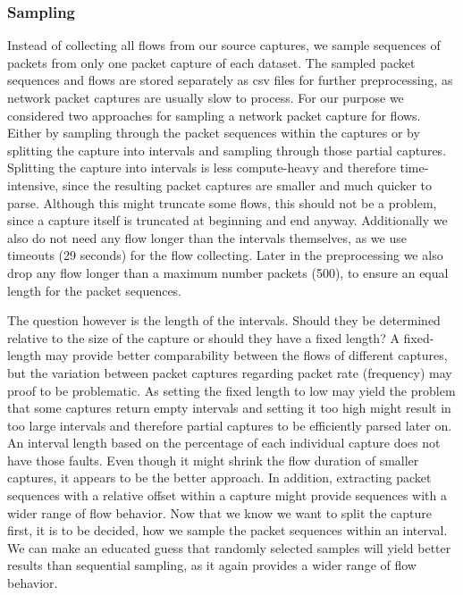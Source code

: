 \documentclass[
	ngerman,
	ruledheaders=section,%
	class=report,%
	thesis={type=bachelor},%
	accentcolor=9c,%
	custommargins=true,%
	marginpar=false,%
	parskip=half-,%
	fontsize=11pt,%
]{tudapub}
\begin{document}
\subsubsection{Sampling}
\label{sec:sampling}

Instead of collecting all flows from our source captures, we sample sequences of packets from only one packet capture of each dataset.
The sampled packet sequences and flows are stored separately as csv files for further preprocessing, as network packet captures are usually slow to process.
For our purpose we considered two approaches for sampling a network packet capture for flows.
Either by sampling through the packet sequences within the captures or by splitting the capture into intervals and sampling through those partial captures.
Splitting the capture into intervals is less compute-heavy and therefore time-intensive, since the resulting packet captures are smaller and much quicker to parse.
Although this might truncate some flows, this should not be a problem, since a capture itself is truncated at beginning and end anyway.
Additionally we also do not need any flow longer than the intervals themselves,
as we use timeouts (29 seconds) for the flow collecting.
Later in the preprocessing we also drop any flow longer than a maximum number packets (500), to ensure an equal length for the packet sequences.

The question however is the length of the intervals.
Should they be determined relative to the size of the capture or should they have a fixed length?
A fixed-length may provide better comparability between the flows of different captures,
but the variation between packet captures regarding packet rate (frequency) may proof to be problematic.
As setting the fixed length to low may yield the problem that some captures return empty intervals
and setting it too high might result in too large intervals and therefore partial captures to be efficiently parsed later on.
An interval length based on the percentage of each individual capture does not have those faults.
Even though it might shrink the flow duration of smaller captures, it appears to be the better approach.
In addition, extracting packet sequences with a relative offset within a capture might provide sequences with a wider range of flow behavior.
Now that we know we want to split the capture first, it is to be decided, how we sample the packet sequences within an interval.
We can make an educated guess that randomly selected samples will yield better results than sequential sampling, as it again provides a wider range of flow behavior.
\end{document}
